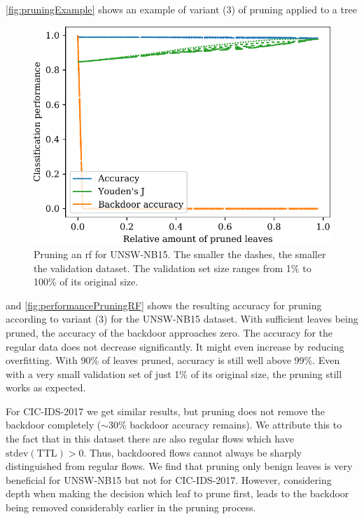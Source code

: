 \documentclass[9pt,sigconf,letterpaper,dvipsnames\ifx\removeHeaders\tempYes ,nonacm\fi]{acmart}
\newcommand\note[2]{{\color{#1}#2}}
\newcommand\todo[1]{{\note{red}{TODO: #1}}}
\newcommand{\unsw}{UNSW-NB15}
\newcommand{\cic}{CIC-IDS-2017}
\begin{document}
\autoref{fig:pruningExample} shows an example of variant (3) of pruning applied to a tree
\begin{figure}[b]
\includegraphics[width=\columnwidth]{figures/prune_CAIA_backdoor_15/prune_oh_d.pdf}
\caption{Pruning an \gls{rf} for \unsw{}. The smaller the dashes, the smaller the validation dataset. The validation set size ranges from 1\% to 100\% of its original size.}
\label{fig:performancePruningRF}
\end{figure}
and \autoref{fig:performancePruningRF} shows the resulting accuracy for pruning according to variant (3) for the \unsw{} dataset. With sufficient leaves being pruned, the accuracy of the backdoor approaches zero. The accuracy for the regular data does not decrease significantly. It might even increase by reducing overfitting. With 90\% of leaves pruned, accuracy is still well above 99\%. Even with a very small validation set of just 1\% of its original size, the pruning still works as expected.

For \cic{} we get similar results, but pruning does not remove the backdoor completely ($\sim$30\% backdoor accuracy remains). We attribute this to the fact that in this dataset there are also regular flows which have $\text{stdev}(\text{TTL}) > 0$. Thus, backdoored flows cannot always be sharply distinguished from regular flows. We find that pruning only benign leaves is very beneficial for \unsw{} but not for \cic{}. However, considering depth when making the decision which leaf to prune first, leads to the backdoor being removed considerably earlier in the pruning process.
\end{document}
